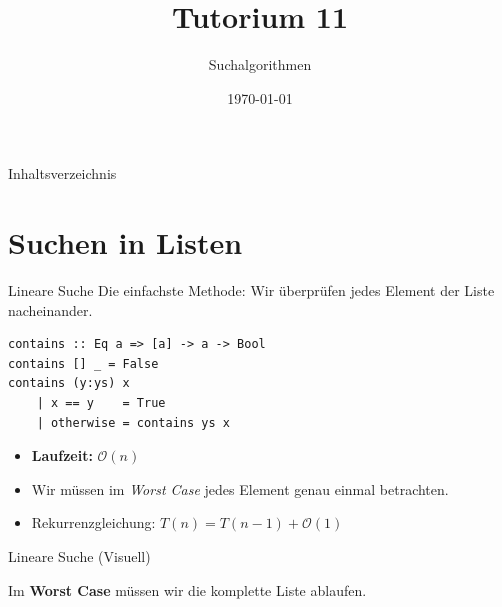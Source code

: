 \documentclass[aspectratio=169,11pt]{beamer}
\title{\textbf{Tutorium 11}}
\subtitle{Suchalgorithmen}
\institute{Grundlagen der Praktischen Informatik}
\author{}
\date{\today}
\begin{document}
\begin{frame}[plain]
    \titlepage
\end{frame}

\begin{frame}{Inhaltsverzeichnis}
    \tableofcontents
\end{frame}

\section{Suchen in Listen}

\begin{frame}[fragile]{Lineare Suche}
    Die einfachste Methode: Wir überprüfen jedes Element der Liste nacheinander.
    
    \begin{tcolorbox}[modernbox, title=Lineare Suche in Haskell]
\begin{lstlisting}
contains :: Eq a => [a] -> a -> Bool
contains [] _ = False
contains (y:ys) x
    | x == y    = True  
    | otherwise = contains ys x
\end{lstlisting}
    \end{tcolorbox}
    
    \begin{itemize}
        \item \textbf{Laufzeit:} $\mathcal{O}(n)$
        \item Wir müssen im \textit{Worst Case} jedes Element genau einmal betrachten.
        \item Rekurrenzgleichung: $T(n) = T(n-1) + \mathcal{O}(1)$
    \end{itemize}
\end{frame}


\begin{frame}{Lineare Suche (Visuell)}
    \begin{center}
    
    \vspace{0.5cm}
    \large Im \textbf{Worst Case} müssen wir die komplette Liste ablaufen.
    \end{center}
\end{frame}
\end{document}
